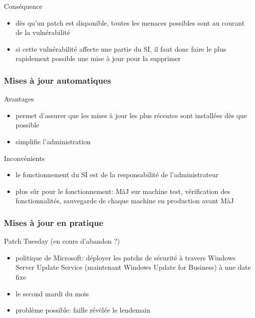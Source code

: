 \begin{reveals}
\begin{frame}
  \vfill
  \begin{block}{Conséquence}
    \begin{itemize}
    \item dès qu'un patch est disponible, toutes les menaces possibles
      sont au courant de la vulnérabilité
    \item si cette vulnérabilité affecte une partie du SI, il faut
      donc faire le plus rapidement possible une mise à jour pour la
      supprimer
    \end{itemize}
  \end{block}

  \vfill
\end{frame}

\begin{frame}
  \frametitle{Mises à jour automatiques}

  \vfill

   \begin{block}{Avantages}
     \begin{itemize}
     \item permet d'assurer que les mises à jour les plus récentes
       sont installées dès que possible
     \item simplifie l'administration
     \end{itemize}
  \end{block}

  \vfill

  \begin{block}{Inconvénients}
    \begin{itemize}
    \item le fonctionnement du SI est de la responsabilité de
      l'administrateur
    \item plus sûr pour le fonctionnement: MàJ sur machine test,
      vérification des fonctionnalités, sauvegarde de chaque machine
      en production avant MàJ
    \end{itemize}
  \end{block}

  \vfill



\end{frame}

\begin{frame}
  \frametitle{Mises à jour en pratique}

  \vfill

   \begin{block}{Patch Tuesday (en cours d'abandon ?)}
     \begin{itemize}
     \item politique de Microsoft: déployer les patchs de sécurité à
       travers Windows Server Update Service (maintenant Windows
       Update for Business) à une date fixe
     \item le second mardi du mois
     \item problème possible: faille révélée le lendemain
     \end{itemize}
  \end{block}


\end{frame}
\end{reveals}
